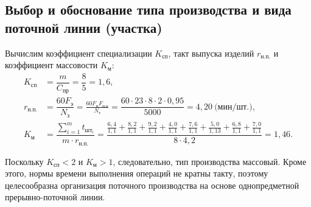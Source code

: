 \subsection[
Выбор и обоснование типа производства и вида поточной линии \\
(участка)
]{
  Выбор и обоснование типа производства и
  вида поточной линии (участка)
}

Вычислим коэффициент специализации \( K_{\text{сп}} \), 
такт выпуска изделий \( r_{\text{н.п.}}\) и
коэффициент массовости \( K_\text{м} \):
\begin{align*}
K_{\text{сп}} &= \dfrac{m}{C_{\text{пр}}} = \dfrac{8}{5} = 1{,}6, \\
r_{\text{н.п.}} &= \dfrac{60 F_{\text{э}}}{N_{\text{з}}} = 
  \frac{60 F_{\text{н}} F_{\text{п.о}}}{N_{\text{з}}} =
  \dfrac{60 \cdot 23 \cdot 8 \cdot 2 \cdot 0{,}95}{5000} =
  4{,}20 \: \text{(мин/шт.)}, \\
K_{\text{м}} &=
\dfrac{\sum^m_{i=1} t_{\text{шт}_{i}}}{m \cdot r_{\text{н.п.}}} = 
\dfrac{
  \frac{6{,}4}{1{,}1} + \frac{8{,}2}{1{,}1} + \frac{9{,}2}{1{,}1} + 
  \frac{4{,}0}{1{,}1} + \frac{7{,}6}{1{,}1} + \frac{5{,}0}{1{,}13} +
  \frac{6{,}8}{1{,}1} + \frac{7{,}0}{1{,}1}
}{
  8 \cdot 4{,}2
} = 1{,}46.
\end{align*}

Поскольку \( K_{\text{сп}} < 2 \) и \( K_{\text{м}} > 1 \),
следовательно, тип производства массовый.
Кроме этого, нормы времени выполнения операций не кратны такту, 
поэтому целесообразна организация поточного производства на основе
однопредметной прерывно-поточной линии.
